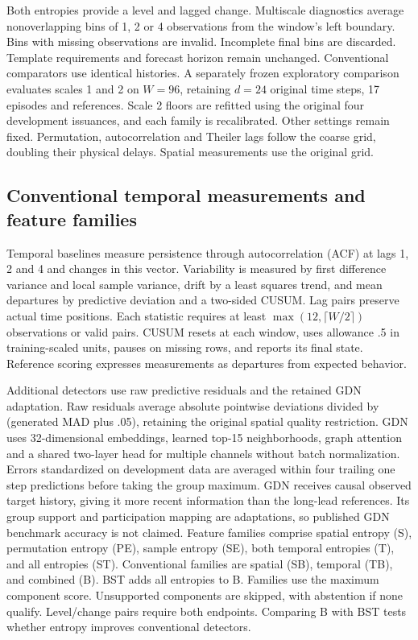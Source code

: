 \documentclass{llncs}
\begin{document}
Both entropies provide a level and lagged change. Multiscale diagnostics
average nonoverlapping bins of 1, 2 or 4 observations from the window's
left boundary. Bins with missing observations are invalid. Incomplete
final bins are discarded. Template requirements and forecast horizon
remain unchanged. Conventional comparators use identical histories.
A separately frozen exploratory comparison evaluates scales 1 and 2 on
$W=96$, retaining $d=24$ original time steps, 17 episodes and references.
Scale 2 floors are refitted using the original four development issuances,
and each family is recalibrated. Other settings remain fixed. Permutation,
autocorrelation and Theiler lags follow the coarse grid, doubling their
physical delays. Spatial measurements use the original grid.




\subsection{Conventional temporal measurements and feature families}
Temporal baselines measure persistence through autocorrelation (ACF) at lags
1, 2 and 4 and changes in this vector. Variability is measured by first difference
variance and local sample variance, drift by a least squares trend, and mean
departures by predictive deviation and a two-sided CUSUM. Lag pairs preserve
actual time positions. Each statistic requires at least
$\max(12,\lceil W/2\rceil)$ observations or valid pairs. CUSUM resets at each
window, uses allowance .5 in training-scaled units, pauses on missing rows,
and reports its final state. Reference scoring expresses measurements as
departures from expected behavior.

Additional detectors use raw predictive residuals and the retained GDN
adaptation. Raw residuals average absolute pointwise deviations divided by
(generated MAD plus .05), retaining the original spatial quality restriction.
GDN uses 32-dimensional embeddings, learned top-15 neighborhoods, graph
attention and a shared two-layer head for multiple channels without batch
normalization. Errors standardized on development data are averaged within
four trailing one step predictions before taking the group maximum. GDN receives
causal observed target history, giving it more recent information than the
long-lead references. Its group support and participation mapping are
adaptations, so published GDN benchmark accuracy is not claimed.
Feature families comprise spatial entropy (S), permutation entropy (PE),
sample entropy (SE), both temporal entropies (T), and all entropies (ST).
Conventional families are spatial (SB), temporal (TB), and combined (B).
BST adds all entropies to B. Families use the maximum component score.
Unsupported components are skipped, with abstention if none qualify.
Level/change pairs require both endpoints. Comparing B with BST tests
whether entropy improves conventional detectors.
\end{document}
